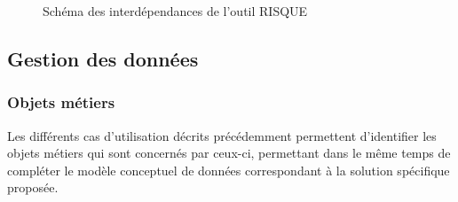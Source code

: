 \begin{figure}[H]
    \label{fig-dep-risque}
    \noindent{}
    \caption{Schéma des interdépendances de l'outil RISQUE}
\end{figure}

\subsection{Gestion des données}

\subsubsection{Objets métiers}

Les différents cas d’utilisation décrits précédemment permettent d’identifier les objets métiers qui sont concernés par ceux-ci, permettant dans le même temps de compléter le modèle conceptuel de données correspondant à la solution spécifique proposée.

